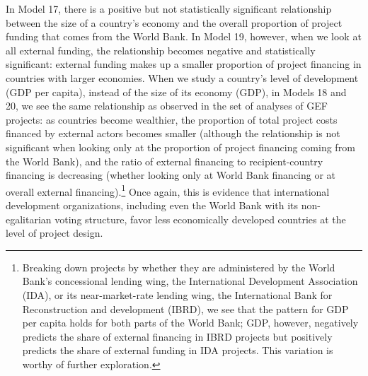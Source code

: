 \documentclass{article}
\begin{document}
In Model 17, there is a positive but not statistically significant relationship between the size of a country’s economy and the overall proportion of project funding that comes from the World Bank.  In Model 19, however, when we look at all external funding, the relationship becomes negative and statistically significant: external funding makes up a smaller proportion of project financing in countries with larger economies. When we study a country’s level of development (GDP per capita), instead of the size of its economy (GDP), in Models 18 and 20, we see the same relationship as observed in the set of analyses of GEF projects: as countries become wealthier, the proportion of total project costs financed by external actors becomes smaller (although the relationship is not significant when looking only at the proportion of project financing coming from the World Bank), and the ratio of external financing to recipient-country financing is decreasing (whether looking only at World Bank financing or at overall external financing).\footnote{Breaking down projects by whether they are administered by the World Bank’s concessional lending wing, the International Development Association (IDA), or its near-market-rate lending wing, the International Bank for Reconstruction and development (IBRD), we see that the pattern for GDP per capita holds for both parts of the World Bank; GDP, however, negatively predicts the share of external financing in IBRD projects but positively predicts the share of external funding in IDA projects.  This variation is worthy of further exploration.}   Once again, this is evidence that international development organizations, including even the World Bank with its non-egalitarian voting structure, favor less economically developed countries at the level of project design.
\end{document}
